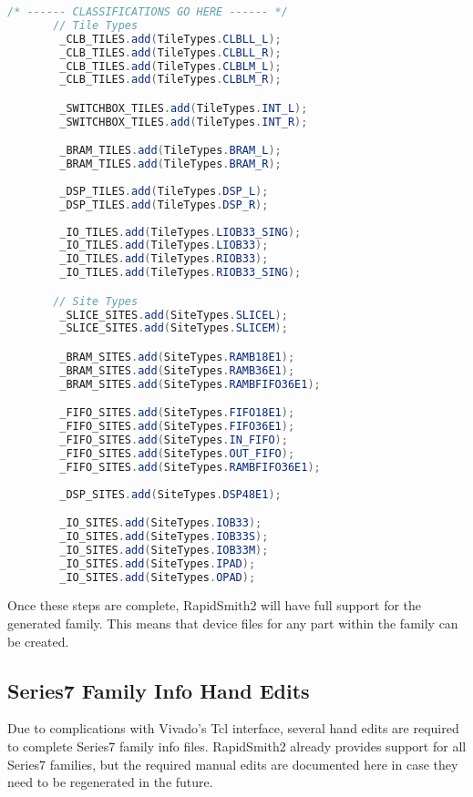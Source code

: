\begin{lstlisting}[language=java,numbers=none, caption=Device classifications
example, label=lst:apdxAClassifications] 
/* ------ CLASSIFICATIONS GO HERE ------ */ 
       // Tile Types
        _CLB_TILES.add(TileTypes.CLBLL_L);
        _CLB_TILES.add(TileTypes.CLBLL_R);
        _CLB_TILES.add(TileTypes.CLBLM_L);
        _CLB_TILES.add(TileTypes.CLBLM_R);

        _SWITCHBOX_TILES.add(TileTypes.INT_L);
        _SWITCHBOX_TILES.add(TileTypes.INT_R);

        _BRAM_TILES.add(TileTypes.BRAM_L);
        _BRAM_TILES.add(TileTypes.BRAM_R);
	
        _DSP_TILES.add(TileTypes.DSP_L);
        _DSP_TILES.add(TileTypes.DSP_R);
	
        _IO_TILES.add(TileTypes.LIOB33_SING);
        _IO_TILES.add(TileTypes.LIOB33);
        _IO_TILES.add(TileTypes.RIOB33);
        _IO_TILES.add(TileTypes.RIOB33_SING);

       // Site Types
        _SLICE_SITES.add(SiteTypes.SLICEL);
        _SLICE_SITES.add(SiteTypes.SLICEM);

        _BRAM_SITES.add(SiteTypes.RAMB18E1);
        _BRAM_SITES.add(SiteTypes.RAMB36E1);
        _BRAM_SITES.add(SiteTypes.RAMBFIFO36E1);

        _FIFO_SITES.add(SiteTypes.FIFO18E1);
        _FIFO_SITES.add(SiteTypes.FIFO36E1);
        _FIFO_SITES.add(SiteTypes.IN_FIFO);
        _FIFO_SITES.add(SiteTypes.OUT_FIFO);
        _FIFO_SITES.add(SiteTypes.RAMBFIFO36E1);
        
        _DSP_SITES.add(SiteTypes.DSP48E1);

        _IO_SITES.add(SiteTypes.IOB33);
        _IO_SITES.add(SiteTypes.IOB33S);
        _IO_SITES.add(SiteTypes.IOB33M);
        _IO_SITES.add(SiteTypes.IPAD);
        _IO_SITES.add(SiteTypes.OPAD);
\end{lstlisting}

\vspace{.3cm}
\noindent Once these steps are complete, RapidSmith2 will have full support for
the generated family. This means that device files for any part within the
family can be created.


\subsection{Series7 Family Info Hand Edits} \label{sec:series7HandEdits}
Due to complications with Vivado's Tcl interface,  several hand edits are
required to complete Series7 family info files. RapidSmith2 already
provides support for all Series7 families, but the required manual edits are
documented here in case they need to be regenerated in the future. 
    

